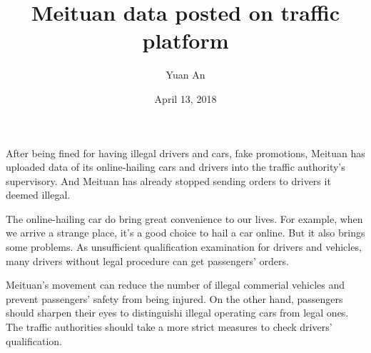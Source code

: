 \documentclass[a4paper,12pt]{article}
\begin{document}
	\title{Meituan data posted on traffic platform}
	\author{Yuan An}
	\date{April 13, 2018}
	\maketitle
	\paragraph{}
	After being fined for having illegal drivers and cars, fake promotions, Meituan has uploaded data of its online-hailing cars and drivers into the traffic authority's supervisory.  And Meituan has already stopped sending orders to drivers it deemed illegal.
	\par
	The online-hailing car do bring great convenience to our lives. For example, when we arrive a strange place, it's a good choice to hail a car online. But it also brings some problems. As unsufficient qualification examination for drivers and vehicles, many drivers without legal procedure can get passengers' orders.
	\par
	Meituan's movement can reduce the number of illegal commerial vehicles and prevent passengers' safety from being injured. On the other hand, passengers should sharpen their eyes to distinguishi illegal operating cars from legal ones. The traffic authorities should take a more strict measures to check drivers' qualification. 
\end{document}
